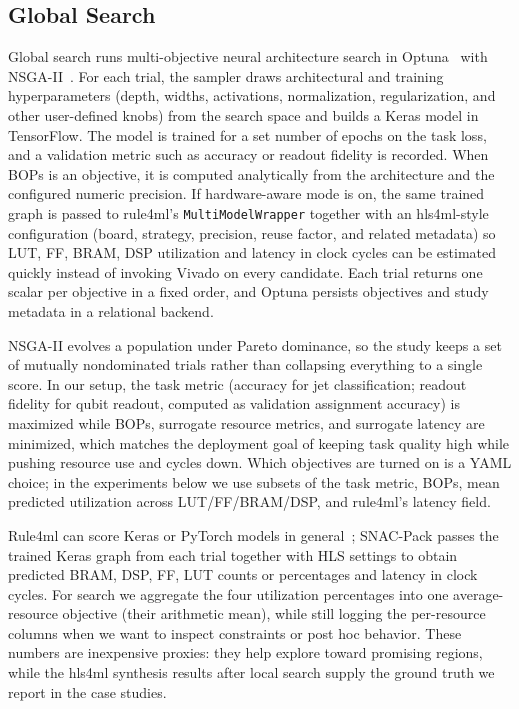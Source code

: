\documentclass[11pt]{article}
\begin{document}
\subsection{Global Search}
\label{sec:method-global}
Global search runs multi-objective neural architecture search in Optuna~\citep{optuna_2019} with NSGA-II~\citep{NSGA}.
For each trial, the sampler draws architectural and training hyperparameters (depth, widths, activations, normalization, regularization, and other user-defined knobs) from the search space and builds a Keras model in TensorFlow.
The model is trained for a set number of epochs on the task loss, and a validation metric such as accuracy or readout fidelity is recorded.
When BOPs is an objective, it is computed analytically from the architecture and the configured numeric precision.
If hardware-aware mode is on, the same trained graph is passed to rule4ml's \texttt{MultiModelWrapper} together with an hls4ml-style configuration (board, strategy, precision, reuse factor, and related metadata) so LUT, FF, BRAM, DSP utilization and latency in clock cycles can be estimated quickly instead of invoking Vivado on every candidate.
Each trial returns one scalar per objective in a fixed order, and Optuna persists objectives and study metadata in a relational backend.

NSGA-II evolves a population under Pareto dominance, so the study keeps a set of mutually nondominated trials rather than collapsing everything to a single score.
In our setup, the task metric (accuracy for jet classification; readout fidelity for qubit readout, computed as validation assignment accuracy) is maximized while BOPs, surrogate resource metrics, and surrogate latency are minimized, which matches the deployment goal of keeping task quality high while pushing resource use and cycles down.
Which objectives are turned on is a YAML choice; in the experiments below we use subsets of the task metric, BOPs, mean predicted utilization across LUT/FF/BRAM/DSP, and rule4ml's latency field.

Rule4ml can score Keras or PyTorch models in general~\citep{Rahimifar_2025}; SNAC-Pack passes the trained Keras graph from each trial together with HLS settings to obtain predicted BRAM, DSP, FF, LUT counts or percentages and latency in clock cycles.
For search we aggregate the four utilization percentages into one average-resource objective (their arithmetic mean), while still logging the per-resource columns when we want to inspect constraints or post hoc behavior.
These numbers are inexpensive proxies: they help explore toward promising regions, while the hls4ml synthesis results after local search supply the ground truth we report in the case studies.
\end{document}
